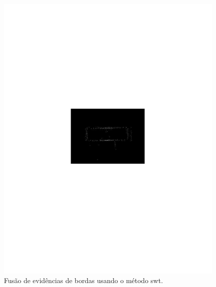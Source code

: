 \documentclass[conference]{IEEEtran}
\begin{document}
\begin{figure}[hbt]
	\includegraphics[scale=0.5]{flevoland_fusao_swt_crop.pdf}
	\caption{Fusão de evidências de bordas usando o método swt.}
\label{fig_06}
\end{figure}
\end{document}
